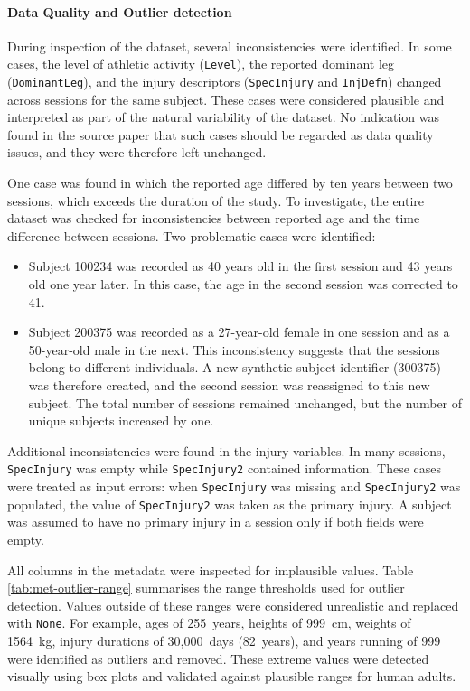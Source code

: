 \paragraph{Data Quality and Outlier detection}
During inspection of the dataset, several inconsistencies were identified. In some cases, the level of athletic activity (\texttt{Level}), the reported dominant leg (\texttt{DominantLeg}), and the injury descriptors (\texttt{SpecInjury} and \texttt{InjDefn}) changed across sessions for the same subject. These cases were considered plausible and interpreted as part of the natural variability of the dataset. No indication was found in the source paper that such cases should be regarded as data quality issues, and they were therefore left unchanged.

One case was found in which the reported age differed by ten years between two sessions, which exceeds the duration of the study. To investigate, the entire dataset was checked for inconsistencies between reported age and the time difference between sessions. Two problematic cases were identified:
\begin{itemize}
    \item Subject 100234 was recorded as 40 years old in the first session and 43 years old one year later. In this case, the age in the second session was corrected to 41.
    \item Subject 200375 was recorded as a 27-year-old female in one session and as a 50-year-old male in the next. This inconsistency suggests that the sessions belong to different individuals. A new synthetic subject identifier (300375) was therefore created, and the second session was reassigned to this new subject. The total number of sessions remained unchanged, but the number of unique subjects increased by one.
\end{itemize}

Additional inconsistencies were found in the injury variables. In many sessions, \texttt{SpecInjury} was empty while \texttt{SpecInjury2} contained information. These cases were treated as input errors: when \texttt{SpecInjury} was missing and \texttt{SpecInjury2} was populated, the value of \texttt{SpecInjury2} was taken as the primary injury. A subject was assumed to have no primary injury in a session only if both fields were empty.

All columns in the metadata were inspected for implausible values. Table \ref{tab:met-outlier-range} summarises the range thresholds used for outlier detection. Values outside of these ranges were considered unrealistic and replaced with \texttt{None}. For example, ages of 255~years, heights of 999~cm, weights of 1564~kg, injury durations of 30,000~days (82~years), and years running of 999 were identified as outliers and removed. These extreme values were detected visually using box plots and validated against plausible ranges for human adults.



